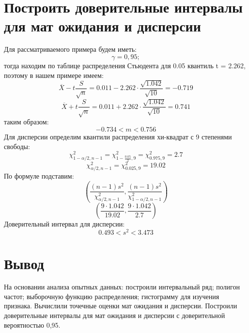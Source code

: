 \documentclass{article}
\begin{document}
\section{Построить доверительные интервалы для мат ожидания и дисперсии}
Для рассматриваемого примера будем иметь:
\[\gamma = 0,95;\]
тогда находим по таблице распределения Стьюдента для 0.05 квантиль  t = 2.262, поэтому в нашем примере имеем:
\[\overline{X}-t\frac{S}{\sqrt{n}} = 0.011 - 2.262 \cdot\frac{\sqrt{1.042}}{\sqrt{10}} = -0.719\]
\[\overline{X}+t\frac{S}{\sqrt{n}} = 0.011 + 2.262 \cdot\frac{\sqrt{1.042}}{\sqrt{10}} = 0.741\]
таким образом:
\[-0.734 < m < 0.756\]
Для дисперсии определим квантили распределения хи-квадрат с 9 степенями свободы:
\[
\chi^2_{1-\alpha/2, n-1} = \chi^2_{1-\frac{0.05}{2}, 9} = \chi^2_{0.975, 9} = 2.7
\]
\[
\chi^2_{\alpha/2, n-1} = \chi^2_{0.025, 9} = 19.02
\]
По формуле подставим:
\[
\left(\frac{{(n-1)s^2}}{{\chi^2_{\alpha/2, n-1}}}, \frac{{(n-1)s^2}}{{\chi^2_{1-\alpha/2, n-1}}} \right)
\]
\[
\left( \frac{{9\cdot 1.042}}{19.02 }, \frac{{9\cdot 1.042}}{2.7} \right)
\]
Доверительный интервал для дисперсии:
\[ 0.493 < s^2 < 3.473\]
\section*{Вывод}
На основании анализа опытных данных: построили интервальный ряд; полигон частот; выборочную функцию распределения; гистограмму для изучения признака.
Вычислили точечные оценки мат ожидания и дисперсии.
Построили доверительные интервалы для мат ожидания и дисперсии с доверительной вероятностью 0,95.
\end{document}
